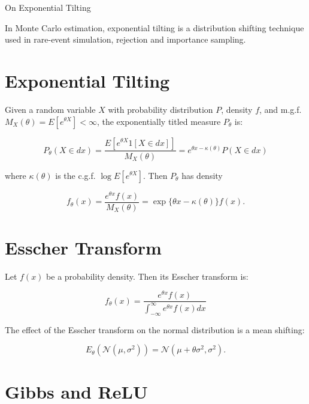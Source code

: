 \documentclass[11pt]{article}
\begin{document}
\begin{center}
{\huge On Exponential Tilting} 
\end{center}

In Monte Carlo estimation, exponential tilting is a distribution shifting technique used in rare-event simulation, rejection and importance sampling.

\section{Exponential Tilting}

Given a random variable $X$ with probability distribution $P$, density $f$, and m.g.f. $M_X(\theta) = E[e^{\theta X}] < \infty$, the exponentially titled measure $P_\theta$ is:

\begin{equation}
P_\theta(X \in dx) = \frac{E[e^{\theta X}1[X\in dx]]}{M_X (\theta)} = e^{\theta x - \kappa(\theta)} P(X \in dx)
\end{equation}

where $\kappa(\theta)$ is the c.g.f. $\log E[e^{\theta X}]$. Then $P_\theta$ has density

\begin{equation}
f_\theta(x) = \frac{e^{\theta x}f(x)}{M_X(\theta)}=\exp\{\theta x - \kappa(\theta) \}f(x).
\end{equation}

\section{Esscher Transform}

Let $f(x)$ be a probability density. Then its Esscher transform is:

\begin{equation}
f_\theta(x) = \frac{ e^{\theta x}f(x) }{ \int_{-\infty}^{\infty} e^{\theta x}f(x)dx }
\end{equation}

The effect of the Esscher transform on the normal distribution is a mean shifting:

\begin{equation}
E_\theta(\mathcal{N}(\mu,\sigma^2)) = \mathcal{N}(\mu+\theta\sigma^2,\sigma^2).
\end{equation}

\section{Gibbs and ReLU}
\end{document}
